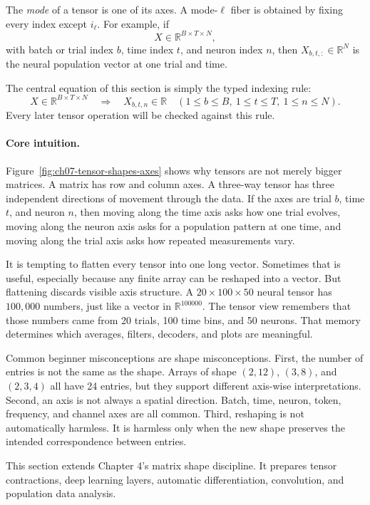 The \emph{mode} of a tensor is one of its axes. A mode-\(\ell\) fiber is obtained by fixing every index except \(i_\ell\). For example, if
\[
X\in\mathbb{R}^{B\times T\times N},
\]
with batch or trial index \(b\), time index \(t\), and neuron index \(n\), then \(X_{b,t,:}\in\mathbb{R}^N\) is the neural population vector at one trial and time.

The central equation of this section is simply the typed indexing rule:
\[
X\in\mathbb{R}^{B\times T\times N}
\quad\Longrightarrow\quad
X_{b,t,n}\in\mathbb{R}
\quad
(1\leq b\leq B,\ 1\leq t\leq T,\ 1\leq n\leq N).
\]
Every later tensor operation will be checked against this rule.

\paragraph{Core intuition.}
Figure~\ref{fig:ch07-tensor-shapes-axes} shows why tensors are not merely bigger matrices. A matrix has row and column axes. A three-way tensor has three independent directions of movement through the data. If the axes are trial \(b\), time \(t\), and neuron \(n\), then moving along the time axis asks how one trial evolves, moving along the neuron axis asks for a population pattern at one time, and moving along the trial axis asks how repeated measurements vary.

It is tempting to flatten every tensor into one long vector. Sometimes that is useful, especially because any finite array can be reshaped into a vector. But flattening discards visible axis structure. A \(20\times 100\times 50\) neural tensor has \(100{,}000\) numbers, just like a vector in \(\mathbb{R}^{100000}\). The tensor view remembers that those numbers came from 20 trials, 100 time bins, and 50 neurons. That memory determines which averages, filters, decoders, and plots are meaningful.

Common beginner misconceptions are shape misconceptions. First, the number of entries is not the same as the shape. Arrays of shape \((2,12)\), \((3,8)\), and \((2,3,4)\) all have 24 entries, but they support different axis-wise interpretations. Second, an axis is not always a spatial direction. Batch, time, neuron, token, frequency, and channel axes are all common. Third, reshaping is not automatically harmless. It is harmless only when the new shape preserves the intended correspondence between entries.

This section extends Chapter 4's matrix shape discipline. It prepares tensor contractions, deep learning layers, automatic differentiation, convolution, and population data analysis.

